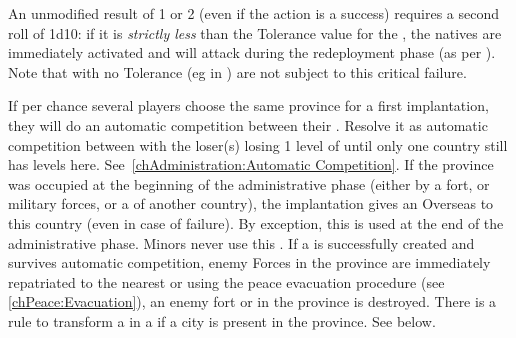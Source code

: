 \aparag\label{chAdministration:Colony:Critical failure} An unmodified result of 1 or
2 (even if the action is a success) requires a second roll of 1d10: if it is
\emph{strictly less} than the Tolerance value for the \Area, the natives are
immediately activated and will attack during the redeployment phase (as per
).
\bparag Note that \Area with no Tolerance (eg in ) are not
subject to this critical failure.

\bparag If per chance several players choose the same province for a first
\COL implantation, they will do an automatic competition between their
\COL. Resolve it as automatic competition between \TP with the loser(s) losing
1 level of \COL until only one country still has levels
here. See~\ref{chAdministration:Automatic Competition}.
\bparag If the province was occupied at the beginning of the administrative
phase (either by a fort, or military forces, or a \TP of another country), the
implantation gives an Overseas \CB to this country (even in case of
failure). By exception, this \CB is used at the end of the administrative
phase. Minors never use this \CB.
\bparag If a \COL is successfully created and survives automatic competition,
enemy Forces in the province are immediately repatriated to the nearest \TP or
\COL using the peace evacuation procedure (see \ref{chPeace:Evacuation}), an
enemy fort or \TP in the province is destroyed.
\bparag There is a rule to transform a \TP in a \COL if a city is present in
the province. See below.


